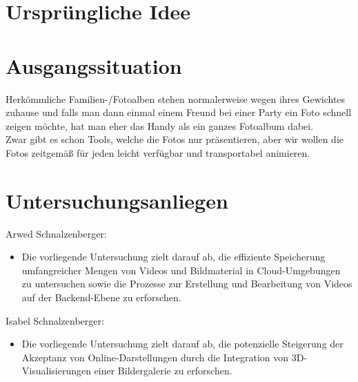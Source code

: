 
\section{Ursprüngliche Idee}

\section{Ausgangssituation}

Herkömmliche Familien-/Fotoalben stehen normalerweise wegen ihres Gewichtes 
zuhause und falls man dann einmal einem Freund bei einer Party ein Foto schnell 
zeigen möchte, hat man eher das Handy als ein ganzes Fotoalbum dabei.
\\
Zwar gibt es schon Tools, welche die Fotos nur präsentieren, 
aber wir wollen die Fotos zeitgemäß für jeden leicht verfügbar und transportabel animieren.

\section{Untersuchungsanliegen}

Arwed Schnalzenberger:
\begin{itemize}
\item Die vorliegende Untersuchung zielt darauf ab, die effiziente Speicherung 
umfangreicher Mengen von Videos und Bildmaterial in Cloud-Umgebungen zu 
untersuchen sowie die Prozesse zur Erstellung und Bearbeitung von Videos 
auf der Backend-Ebene zu erforschen.
\end{itemize}


Isabel Schnalzenberger:
\begin{itemize}
\item Die vorliegende Untersuchung zielt darauf ab, die potenzielle Steigerung 
der Akzeptanz von Online-Darstellungen durch die Integration von 
3D-Visualisierungen einer Bildergalerie zu erforschen.
\end{itemize}